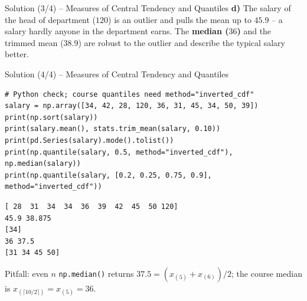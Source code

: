 \documentclass[aspectratio=169,11pt]{beamer}
\begin{document}
\begin{frame}{Solution (3/4) -- Measures of Central Tendency and Quantiles}
  \textbf{d)} The salary of the head of department ($120$) is an outlier and pulls the mean up to
  $45.9$ -- a salary hardly anyone in the department earns. The \textbf{median ($36$)} and the
  trimmed mean ($38.9$) are robust to the outlier and describe the typical salary better.
  \begin{center}
  \end{center}
\end{frame}

\begin{frame}[fragile]{Solution (4/4) -- Measures of Central Tendency and Quantiles}
\begin{lstlisting}
# Python check; course quantiles need method="inverted_cdf"
salary = np.array([34, 42, 28, 120, 36, 31, 45, 34, 50, 39])
print(np.sort(salary))
print(salary.mean(), stats.trim_mean(salary, 0.10))
print(pd.Series(salary).mode().tolist())
print(np.quantile(salary, 0.5, method="inverted_cdf"), np.median(salary))
print(np.quantile(salary, [0.2, 0.25, 0.75, 0.9], method="inverted_cdf"))
\end{lstlisting}
\begin{lstlisting}[style=Pyout,aboveskip=2pt]
[ 28  31  34  34  36  39  42  45  50 120]
45.9 38.875
[34]
36 37.5
[31 34 45 50]
\end{lstlisting}
  \begin{alertblock}{Pitfall: even $n$}
    \texttt{np.median()} returns $37.5 = (x_{(5)} + x_{(6)})/2$; the course median is
    $x_{(\lceil 10/2 \rceil)} = x_{(5)} = 36$.
  \end{alertblock}
\end{frame}
\end{document}
